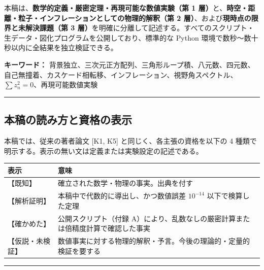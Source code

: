 \documentclass[
  a4paper,
]{ltjsarticle}
\newcounter{none} %
\begin{document}
本稿は、\textbf{数学的定義・厳密定理・再現可能な数値実験（第 1
層）}と、\textbf{時空・距離・粒子・インフレーションとしての物理的解釈（第
2 層）}、および\textbf{現時点の限界と未解決課題（第 3
層）}を明確に分離して記述する。すべてのスクリプト・生データ・図化プログラムを公開しており、標準的な
Python 環境で数秒〜数十秒以内に全結果を独立検証できる。

\textbf{キーワード：}
背景独立、三次元正方配列、三角形ループ積、八元数、四元数、自己無撞着、カスケード相転移、インフレーション、視野角スペクトル、\(\sum z_n^2 = 0\)、再現可能数値実験

\begin{center}\rule{0.5\linewidth}{0.5pt}\end{center}

\subsection{本稿の読み方と資格の表示}\label{ux672cux7a3fux306eux8aadux307fux65b9ux3068ux8cc7ux683cux306eux8868ux793a}

本稿では、従来の著者論文 {[}K1, K5{]} と同じく、各主張の資格を以下の 4
種類で明示する。表示の無い文は定義または実験設定の記述である。

{\def\LTcaptype{none} %
\begin{longtable}[]{@{}
  >{\raggedright\arraybackslash}p{}
  >{\raggedright\arraybackslash}p{}@{}}
\toprule\noalign{}
\begin{minipage}[b]{\linewidth}\raggedright
表示
\end{minipage} & \begin{minipage}[b]{\linewidth}\raggedright
意味
\end{minipage} \\
\midrule\noalign{}
\endhead
\bottomrule\noalign{}
\endlastfoot
【既知】 & 確立された数学・物理の事実。出典を付す \\
【解析証明】 & 本稿中で代数的に導出し、かつ数値誤差 \(10^{-14}\)
以下で検算した定理 \\
【確かめた】 & 公開スクリプト（付録
A）により、乱数なしの厳密計算または倍精度計算で確認した事実 \\
【仮説・未検証】 &
数値事実に対する物理的解釈・予言。今後の理論的・定量的検証を要する \\
\end{longtable}
}

\begin{center}\rule{0.5\linewidth}{0.5pt}\end{center}
\end{document}
